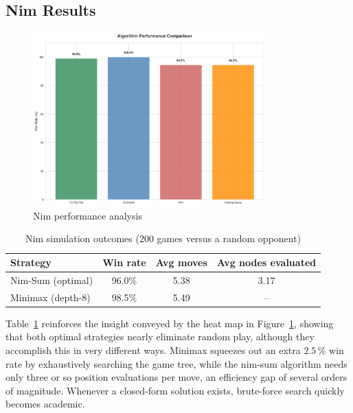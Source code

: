 \documentclass[12pt]{article}
\begin{document}
\subsection{Nim Results}

\begin{figure}[H]
    \centering
    \includegraphics[width=0.8\textwidth]{output/images/performance_analysis.png}
    \caption{Nim performance analysis}
    \label{fig:nim_performance}
\end{figure}

\begin{table}[H]
    \centering
    \begin{tabular}{lccc}
        \toprule
        \textbf{Strategy} & \textbf{Win rate} & \textbf{Avg moves} & \textbf{Avg nodes evaluated} \\
        \midrule
        Nim-Sum (optimal) & 96.0\% & 5.38 & 3.17 \\
        Minimax (depth-8) & 98.5\% & 5.49 & -- \\
        \bottomrule
    \end{tabular}
    \caption{Nim simulation outcomes (200 games versus a random opponent)}
    \label{tab:nim_results}
\end{table}

Table~\ref{tab:nim_results} reinforces the insight conveyed by the heat map in Figure~\ref{fig:nim_performance}, showing that both optimal strategies nearly eliminate random play, although they accomplish this in very different ways. Minimax squeezes out an extra \(2.5\,\%\) win rate by exhaustively searching the game tree, while the nim-sum algorithm needs only three or so position evaluations per move, an efficiency gap of several orders of magnitude. Whenever a closed-form solution exists, brute-force search quickly becomes academic.
\end{document}
